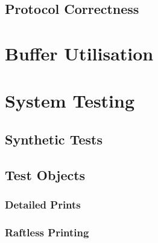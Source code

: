 		\subsection{Protocol Correctness}
	
	\section{Buffer Utilisation}
	
	\section{System Testing}
		
		\subsection{Synthetic Tests}
		
		\subsection{Test Objects}
			
			\subsubsection{Detailed Prints}
			
			\subsubsection{Raftless Printing}
